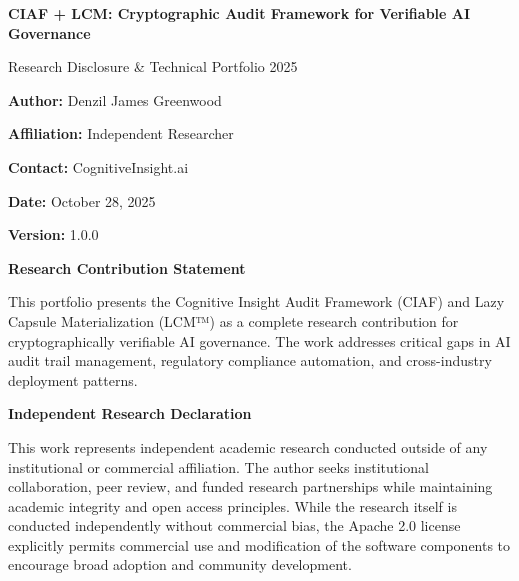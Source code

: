 \documentclass[12pt,a4paper]{article}
\begin{document}
\begin{titlepage}
\centering
\vspace*{1cm}

{\Huge\bfseries\color{ciafdarkblue} CIAF + LCM: Cryptographic Audit Framework for Verifiable AI Governance\par}
\vspace{0.5cm}
{\LARGE\color{ciafblue} Research Disclosure \& Technical Portfolio 2025\par}
\vspace{2cm}

{\Large\textbf{Author:} Denzil James Greenwood\par}
\vspace{0.5cm}
{\large\textbf{Affiliation:} Independent Researcher\par}
\vspace{0.5cm}
{\large\textbf{Contact:} CognitiveInsight.ai\par}
\vspace{0.5cm}
{\large\textbf{Date:} October 28, 2025\par}
\vspace{0.5cm}
{\large\textbf{Version:} 1.0.0\par}

\vspace{2cm}

\begin{executivebox}
\textbf{Research Contribution Statement}

This portfolio presents the Cognitive Insight Audit Framework (CIAF) and Lazy Capsule Materialization (LCM™) as a complete research contribution for cryptographically verifiable AI governance. The work addresses critical gaps in AI audit trail management, regulatory compliance automation, and cross-industry deployment patterns.

\vspace{0.5cm}

\textbf{Independent Research Declaration} 

This work represents independent academic research conducted outside of any institutional or commercial affiliation. The author seeks institutional collaboration, peer review, and funded research partnerships while maintaining academic integrity and open access principles. While the research itself is conducted independently without commercial bias, the Apache 2.0 license explicitly permits commercial use and modification of the software components to encourage broad adoption and community development.
\end{executivebox}


\end{titlepage}
\end{document}
